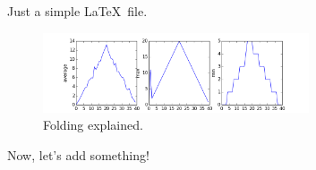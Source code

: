 \documentclass[preprint,showpacs,nofootinbib,floatfix]{revtex4-1}
\begin{document}
Just a simple \LaTeX\ file.



\begin{figure}[h!]
\includegraphics[width=0.70\textwidth]{plot.png}
\caption{Folding explained.}
\label{fig_folding} 
\end{figure} 


Now, let's add something!

%


%


\vfill\eject
\newpage

\end{document}
